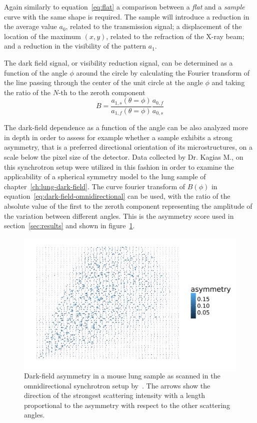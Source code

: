 Again similarly to equation~\ref{eq:flat} a comparison between a
\emph{flat} and a \emph{sample} curve with the same shape is required. The
sample will introduce a reduction in the average value $a_0$, related to the
transmission signal; a displacement of the location of the maximum $(x, y)$,
related to the refraction of the X-ray beam; and a reduction in the
visibility of the pattern $a_1$. 

The dark field signal, or visibility reduction signal, can be
determined as a function of the angle $\phi$ around the circle by
calculating the Fourier transform of the line passing through the center of
the unit circle at the angle $\phi$ and taking the ratio of the $N$-th to
the zeroth component
\begin{equation}
    B = \frac{a_{1,s}(\theta = \phi)}{a_{1,f}(\theta =
\phi)}\frac{a_{0,f}}{a_{0,s}}
    \label{eq:dark-field-omnidirectional}
\end{equation}

The dark-field dependence as a function of the angle can be also analyzed
more in depth in order to assess for example whether a sample exhibits a
strong asymmetry, that is a preferred directional orientation of its
microstructures, on a scale below the pixel size of the detector. Data
collected by Dr. Kagias M., on this synchrotron setup were utilized in this
fashion in order to examine the applicability of a spherical symmetry model
to the lung sample of chapter~\ref{ch:lung-dark-field}. The curve
fourier transform of $B(\phi)$ in
equation~\ref{eq:dark-field-omnidirectional} can be used, with the ratio of
the absolute value of the first to the zeroth component representing the
amplitude of the variation between different angles. This is the asymmetry
score used in section~\ref{sec:results} and shown in
figure~\ref{fig:lung_omnidir_asym}.

\begin{figure}[ht]
    \centering
    \includegraphics[width=\textwidth]{gfx/lung_omnidir.png}
    \caption[Dark-field asymmetry for a mouse lung.]{Dark-field asymmetry in a mouse lung sample as scanned in the
        omnidirectional synchrotron setup by~\cite{PhysRevLett.116.093902}.
    The arrows show the direction of the strongest scattering intensity with
    a length proportional to the asymmetry with respect to the other
scattering angles.}
    \label{fig:lung_omnidir_asym}
\end{figure}

